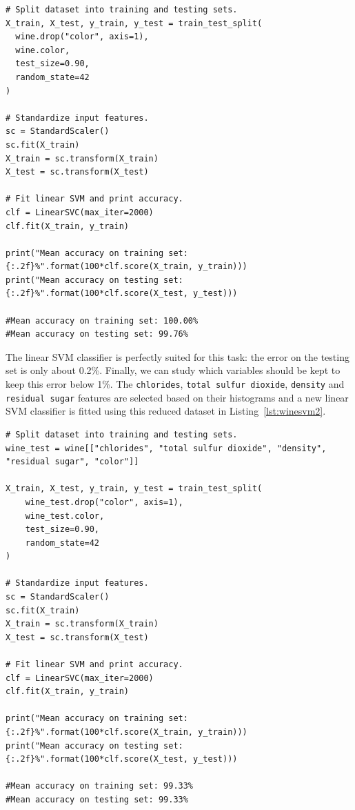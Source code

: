 \documentclass[12pt]{article}
\begin{document}
  \begin{lstlisting}[caption={Linear SVM classifier of wine color.},
    captionpos=b, label={lst:winesvm}]
# Split dataset into training and testing sets.
X_train, X_test, y_train, y_test = train_test_split(
  wine.drop("color", axis=1), 
  wine.color, 
  test_size=0.90, 
  random_state=42
)

# Standardize input features.
sc = StandardScaler()
sc.fit(X_train)
X_train = sc.transform(X_train)
X_test = sc.transform(X_test)

# Fit linear SVM and print accuracy.
clf = LinearSVC(max_iter=2000)
clf.fit(X_train, y_train)

print("Mean accuracy on training set: {:.2f}%".format(100*clf.score(X_train, y_train)))
print("Mean accuracy on testing set: {:.2f}%".format(100*clf.score(X_test, y_test)))

#Mean accuracy on training set: 100.00%
#Mean accuracy on testing set: 99.76%
  \end{lstlisting}

  The linear SVM classifier is perfectly suited for this task: the error on the
  testing set is only about 0.2\%. Finally, we can study which variables should
  be kept to keep this error below 1\%. The \lstinline{chlorides},
  \lstinline{total sulfur dioxide}, \lstinline{density} and
  \lstinline{residual sugar} features are selected based on their histograms
  and a new linear SVM classifier is fitted using this reduced dataset in
  Listing~\ref{lst:winesvm2}.

  \begin{lstlisting}[caption={Linear SVM classifier of wine color.},
    captionpos=b, label={lst:winesvm2}]
# Split dataset into training and testing sets.
wine_test = wine[["chlorides", "total sulfur dioxide", "density", "residual sugar", "color"]]

X_train, X_test, y_train, y_test = train_test_split(
    wine_test.drop("color", axis=1), 
    wine_test.color, 
    test_size=0.90, 
    random_state=42
)

# Standardize input features.
sc = StandardScaler()
sc.fit(X_train)
X_train = sc.transform(X_train)
X_test = sc.transform(X_test)

# Fit linear SVM and print accuracy.
clf = LinearSVC(max_iter=2000)
clf.fit(X_train, y_train)

print("Mean accuracy on training set: {:.2f}%".format(100*clf.score(X_train, y_train)))
print("Mean accuracy on testing set: {:.2f}%".format(100*clf.score(X_test, y_test)))

#Mean accuracy on training set: 99.33%
#Mean accuracy on testing set: 99.33%
  \end{lstlisting}
\end{document}

